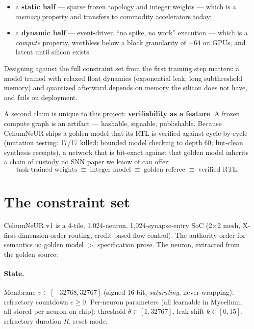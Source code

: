 \documentclass[11pt]{article}
\begin{document}
\begin{itemize}
  \item a \textbf{static half} --- sparse frozen topology and integer weights
    --- which is a \emph{memory} property and transfers to commodity
    accelerators today;
  \item a \textbf{dynamic half} --- event-driven ``no spike, no work''
    execution --- which is a \emph{compute} property, worthless below a block
    granularity of ${\sim}64$ on GPUs, and latent until silicon exists.
\end{itemize}

Designing against the full constraint set from the first training step
matters: a model trained with relaxed float dynamics (exponential leak, long
subthreshold memory) and quantized afterward depends on memory the silicon
does not have, and fails on deployment.

A second claim is unique to this project: \textbf{verifiability as a
feature}. A frozen compute graph is an artifact --- hashable, signable,
publishable. Because CeliumNeUR ships a golden model that its RTL is verified
against cycle-by-cycle (mutation testing: 17/17 killed; bounded model
checking to depth 60; lint-clean synthesis receipts), a network that is
bit-exact against that golden model inherits a chain of custody no SNN paper
we know of can offer:
\[
\text{task-trained weights} \;\equiv\; \text{integer model} \;\equiv\;
\text{golden referee} \;\equiv\; \text{verified RTL.}
\]

\section{The constraint set}

CeliumNeUR v1 is a 4-tile, 1{,}024-neuron, 1{,}024-synapse-entry SoC
(2$\times$2 mesh, X-first dimension-order routing, credit-based flow
control). The authority order for semantics is: golden model $>$
specification prose. The neuron, extracted from the golden source:

\paragraph{State.} Membrane $v \in [-32768, 32767]$ (signed 16-bit,
\emph{saturating}, never wrapping); refractory countdown $c \geq 0$.
Per-neuron parameters (all learnable in Mycelium, all stored per neuron on
chip): threshold $\theta \in [1, 32767]$, leak shift $k \in [0,15]$,
refractory duration $R$, reset mode.
\end{document}
